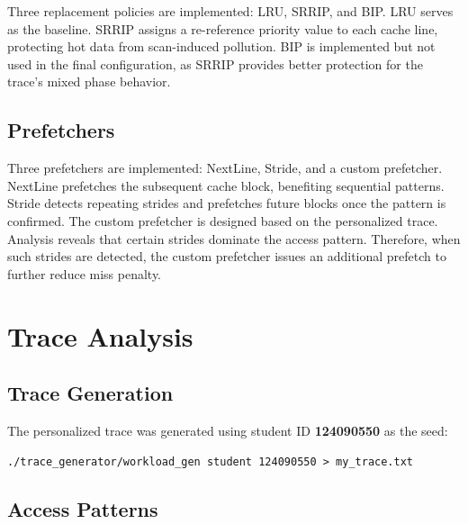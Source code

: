 \documentclass[11pt]{article}
\begin{document}
Three replacement policies are implemented: LRU, SRRIP, and BIP. LRU serves as the baseline. SRRIP assigns a re-reference priority value to each cache line, protecting hot data from scan-induced pollution. BIP is implemented but not used in the final configuration, as SRRIP provides better protection for the trace's mixed phase behavior.

\subsection{Prefetchers}

Three prefetchers are implemented: NextLine, Stride, and a custom prefetcher. NextLine prefetches the subsequent cache block, benefiting sequential patterns. Stride detects repeating strides and prefetches future blocks once the pattern is confirmed.
\newline
The custom prefetcher is designed based on the personalized trace. Analysis reveals that certain strides dominate the access pattern. Therefore, when such strides are detected, the custom prefetcher issues an additional prefetch to further reduce miss penalty.
\section{Trace Analysis}

\subsection{Trace Generation}

The personalized trace was generated using student ID \textbf{124090550} as the seed:
\begin{verbatim}
./trace_generator/workload_gen student 124090550 > my_trace.txt
\end{verbatim}

\subsection{Access Patterns}
\end{document}
